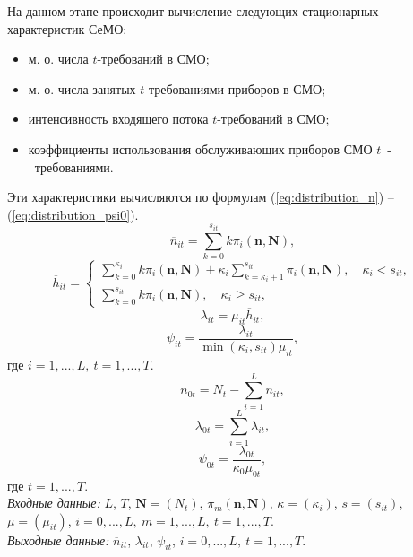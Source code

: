 На данном этапе происходит вычисление следующих стационарных характеристик СеМО:
\begin{itemize}
\item м. о. числа $t$-требований в СМО;
\item м. о. числа занятых $t$-требованиями приборов в СМО;
\item интенсивность входящего потока $t$-требований в СМО;
\item коэффициенты использования обслуживающих приборов СМО $t$~-~требованиями.
\end{itemize}
Эти характеристики вычисляются по формулам (\ref{eq:distribution_n}) -- (\ref{eq:distribution_psi0}).\\
\begin{equation}
\overline{n}_{it} = \sum\limits_{k=0}^{s_{it}} k \pi_i(\mathbf{n},\mathbf{N}),
 \label{eq:distribution_n}
\end{equation}
\begin{equation}
\overline{h}_{it} = \left\{
 \begin{array}{l}
 \sum\limits_{k=0}^{\kappa_i} k \pi_i(\mathbf{n},\mathbf{N}) + \kappa_i  \sum\limits_{k=\kappa_i + 1}^{s_{it}} \pi_i(\mathbf{n},\mathbf{N}), \quad \kappa_i < s_{it}, \\
 \sum\limits_{k=0}^{s_{it}} k \pi_i(\mathbf{n},\mathbf{N}), \quad \kappa_i \ge s_{it},
 \end{array}
\right.
 \label{eq:distribution_h}
\end{equation}
\begin{equation}
\lambda_{it} = \mu_{it} \overline{h}_{it},
 \label{eq:distribution_lambda}
\end{equation}
\begin{equation}
\psi_{it} = \frac{\lambda_{it}}{\min(\kappa_{i}, s_{it}) \mu_{it}},
 \label{eq:distribution_psi}
\end{equation}
где $i=1,...,L,~t=1,...,T$.
\begin{equation}
\overline{n}_{0t} = N_t - \sum\limits_{i=1}^L \overline{n}_{it},
 \label{eq:distribution_n0}
\end{equation}
\begin{equation}
\lambda_{0t} = \sum\limits_{i=1}^L \lambda_{it},
 \label{eq:distribution_lambda0}
\end{equation}
\begin{equation}
\psi_{0t} = \frac{\lambda_{0t}}{\kappa_0 \mu_{0t}},
 \label{eq:distribution_psi0}
\end{equation}
где $t=1,...,T$. \\
\emph{Входные данные:} $L$, $T$, $\mathbf{N}=(N_t)$, $\pi_m(\mathbf{n},\mathbf{N})$, $\kappa=(\kappa_i)$, $s=(s_{it})$, $\mu=(\mu_{it})$, $i=0,...,L,~m=1,...,L,~t=1,...,T$.\\
\emph{Выходные данные:} $\overline{n}_{it}$, $\lambda_{it}$, $\psi_{it}$, $i=0,...,L,~t=1,...,T$.


